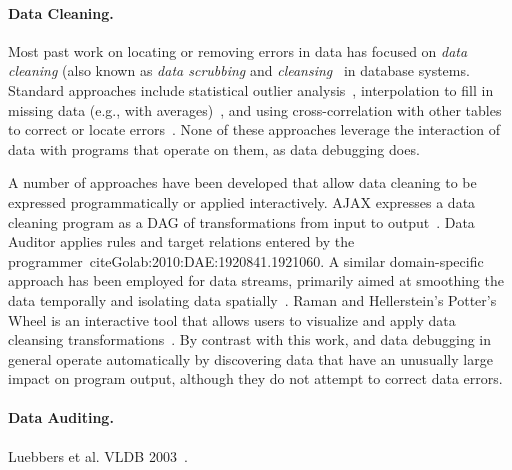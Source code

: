 
\paragraph{Data Cleaning.}
Most past work on locating or removing errors in data has focused
on \emph{data cleaning} (also known as \emph{data scrubbing}
and \emph{cleansing}~\cite{DBLP:journals/debu/RahmD00} in database
systems. Standard approaches include statistical outlier
analysis~\cite{FIXME}, interpolation to fill in missing data (e.g.,
with averages)~\cite{FIXME}, and using cross-correlation with other
tables to correct or locate errors~\cite{FIXME}. None of these
approaches leverage the interaction of data with programs that operate
on them, as data debugging does.



A number of approaches have been developed that allow data cleaning to
be expressed programmatically or applied interactively. AJAX expresses
a data cleaning program as a DAG of transformations from input to
output~\cite{Galhardas:2000:AED:342009.336568}. Data Auditor applies
rules and target relations entered by the
programmer~cite{Golab:2010:DAE:1920841.1921060}. A similar
domain-specific approach has been employed for data streams, primarily
aimed at smoothing the data temporally and isolating data
spatially~\cite{1617508}. Raman and Hellerstein's Potter's Wheel is an
interactive tool that allows users to visualize and apply data
cleansing transformations~\cite{Raman:2001:PWI:645927.672045}. By
contrast with this work, \checkcell{} and data debugging in general
operate automatically by discovering data that have an unusually large
impact on program output, although they do not attempt to correct data
errors.

\paragraph{Data Auditing.}
Luebbers et al. VLDB 2003~\cite{Luebbers:2003:SDD:1315451.1315499}.

